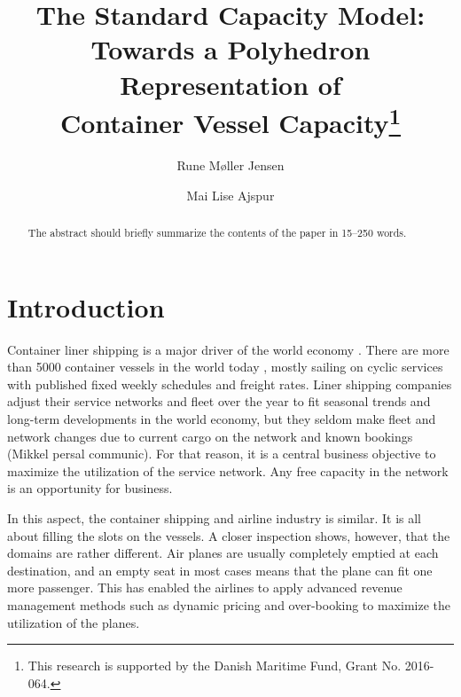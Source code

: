 \documentclass[runningheads]{llncs}
\begin{document}
%
\title{The Standard Capacity Model: \\Towards a Polyhedron Representation of\\ Container Vessel Capacity\thanks{This research is supported by the Danish Maritime Fund, Grant No. 2016-064.}}
%
%
\author{Rune M{\o}ller Jensen \and
Mai Lise Ajspur}
%

%
%
\maketitle              %
%
\begin{abstract}
The abstract should briefly summarize the contents of the paper in
15--250 words.

\end{abstract}

\section{Introduction}
Container liner shipping is a major driver of the world economy \cite{TE13}. There are more than 5000 container vessels in the world today \cite{RMT16}, mostly sailing on cyclic services with published fixed weekly schedules and freight rates. Liner shipping companies adjust their service networks and fleet over the year to fit seasonal trends and long-term developments in the world economy, but they seldom make fleet and network changes due to current cargo on the network and known bookings (Mikkel persal communic). For that reason, it is a central business objective to maximize the utilization of the service network. Any free capacity in the network is an opportunity for business.

In this aspect, the container shipping and airline industry is similar. It is all about filling the slots on the vessels. A closer inspection shows, however, that the domains are rather different. Air planes are usually completely emptied at each destination, and an empty seat in most cases means that the plane can fit one more passenger. This has enabled the airlines to apply advanced revenue management methods such as dynamic pricing and over-booking to maximize the utilization of the planes.
\end{document}
